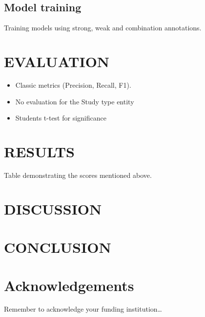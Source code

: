 \documentclass[10.7pt,]{article}
\begin{document}
\subsection{Model training}\label{modtrain}
Training models using strong, weak and combination annotations.
%
%
%
\section{EVALUATION}\label{eval}
\begin{itemize}
    \item Classic metrics (Precision, Recall, F1).
    \item No evaluation for the Study type entity
    \item Students t-test for significance
\end{itemize}
%
%
%
\section{RESULTS}\label{results}
Table demonstrating the scores mentioned above.
%
%
%
\section{DISCUSSION}\label{discussion}
\lipsum[3-4]
%
%
%
\section{CONCLUSION}\label{conclusion}
\lipsum[3-4]
%
%
%
\section{Acknowledgements}\label{acknowledgements}
Remember to acknowledge your funding institution\ldots
%
%
%


\end{document}
